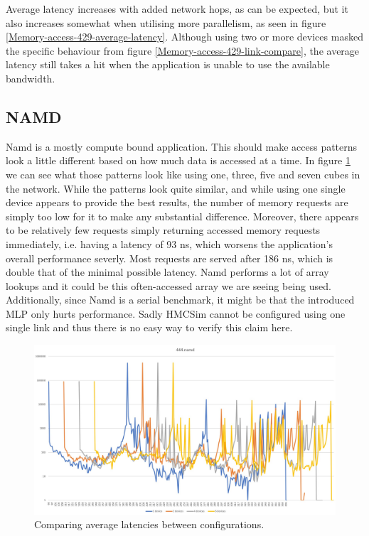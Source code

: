 Average latency increases with added network hops, as can be expected, but it also increases somewhat when utilising more parallelism, as seen in figure \ref{Memory-access-429-average-latency}. Although using two or more devices masked the specific behaviour from figure \ref{Memory-access-429-link-compare}, the average latency still takes a hit when the application is unable to use the available bandwidth.

\subsection{NAMD}
Namd is a mostly compute bound application. This should make access patterns look a little different based on how much data is accessed at a time. In figure \ref{Memory-access-444} we can see what those patterns look like using one, three, five and seven cubes in the network. While the patterns look quite similar, and while using one single device appears to provide the best results, the number of memory requests are simply too low for it to make any substantial difference. Moreover, there appears to be relatively few requests simply returning accessed memory requests immediately, i.e. having a latency of 93 ns, which worsens the application's overall performance severly. Most requests are served after 186 ns, which is double that of the minimal possible latency. Namd performs a lot of array lookups and it could be this often-accessed array we are seeing being used. Additionally, since Namd is a serial benchmark, it might be that the introduced MLP only hurts performance. Sadly HMCSim cannot be configured using one single link and thus there is no easy way to verify this claim here.

\begin{figure}[!h]
    \centering
    \includegraphics[width=1\linewidth]{figure/444-x.4-1.jpg}
    \caption{Comparing average latencies between configurations.}
    \label{Memory-access-444}
\end{figure}


